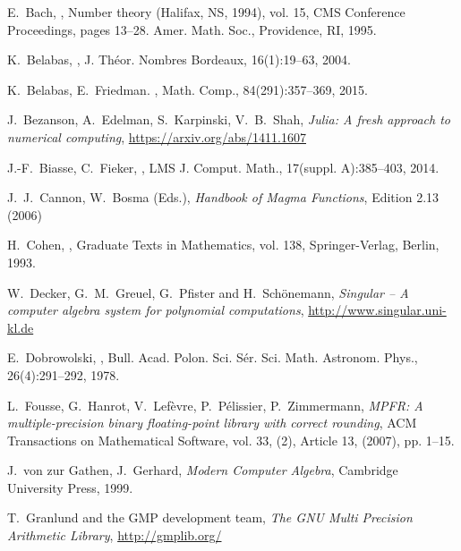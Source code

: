 \documentclass{sig-alternate-05-2015}
\begin{document}
\begin{thebibliography}{99}

E.~Bach,
,
\newblock Number theory ({H}alifax, {NS}, 1994), vol. 15, CMS
  Conference Proceedings, pages 13--28. Amer. Math. Soc., Providence, RI, 1995.

K.~Belabas,
,
\newblock J. Th\'eor. Nombres Bordeaux, 16(1):19--63, 2004.

K.~Belabas, E.~Friedman.
,
\newblock Math. Comp., 84(291):357--369, 2015.

J.~Bezanson, A.~Edelman, S.~Karpinski, V.~B.~Shah, {\em Julia: A fresh approach to numerical computing}, \url{https://arxiv.org/abs/1411.1607}

J.-F.~Biasse, C.~Fieker,
,
\newblock LMS J. Comput. Math., 17(suppl. A):385--403, 2014.

J.~J.~Cannon, W.~Bosma (Eds.), {\em Handbook of Magma Functions}, Edition 2.13 (2006)

H.~Cohen,
,
  Graduate Texts in Mathematics, vol. 138,
\newblock Springer-Verlag, Berlin, 1993.

W.~Decker, G.~M.~Greuel, G.~Pfister and H.~Sch\"onemann, {\em Singular -- A computer algebra system for polynomial computations}, \url{http://www.singular.uni-kl.de}

E.~Dobrowolski,
,
\newblock Bull. Acad. Polon. Sci. S\'er. Sci. Math. Astronom. Phys.,
  26(4):291--292, 1978.

L.~Fousse, G.~Hanrot, V.~Lef\`{e}vre, P.~P\'{e}lissier, P.~Zimmermann, {\em MPFR: A multiple-precision
binary floating-point library with correct rounding}, ACM Transactions on Mathematical Software, vol. 33, (2), Article 13, (2007), pp. 1--15.

J.~von zur Gathen, J.~Gerhard, {\em Modern Computer Algebra}, Cambridge University Press, 1999.

T.~Granlund and the GMP development team, {\em The GNU Multi Precision Arithmetic 
Library}, \url{http://gmplib.org/}


\end{thebibliography}
\end{document}
